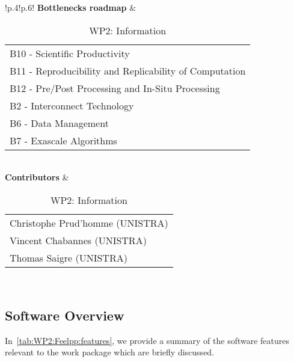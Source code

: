 \begin{table}[!ht]
{{\begin{tabular}{!{\color{numpexgray}\vrule}p{.4\textwidth}!{\color{numpexgray}\vrule}p{.6\textwidth}!{\color{numpexgray}\vrule}}
        \textbf{Bottlenecks roadmap} & \begin{tabular}{l}
B10 - Scientific Productivity\\
B11 - Reproducibility and Replicability of Computation\\
B12 - Pre/Post Processing and In-Situ Processing\\
B2 - Interconnect Technology\\
B6 - Data Management\\
B7 - Exascale Algorithms\\
\end{tabular} \\
\textbf{Contributors} & \begin{tabular}{l}
    Christophe Prud'homme (UNISTRA)\\
    Vincent Chabannes (UNISTRA)\\
    Thomas Saigre (UNISTRA)\\
\end{tabular}\\
        \bottomrule
    \end{tabular}
    }}
    \caption{WP2: \Feelpp Information}
\end{table}

\subsection{Software Overview}
\label{sec:WP2:Feelpp:summary}

In~\cref{tab:WP2:Feelpp:features}, we provide a summary of the software features relevant to the work package which are briefly discussed.

